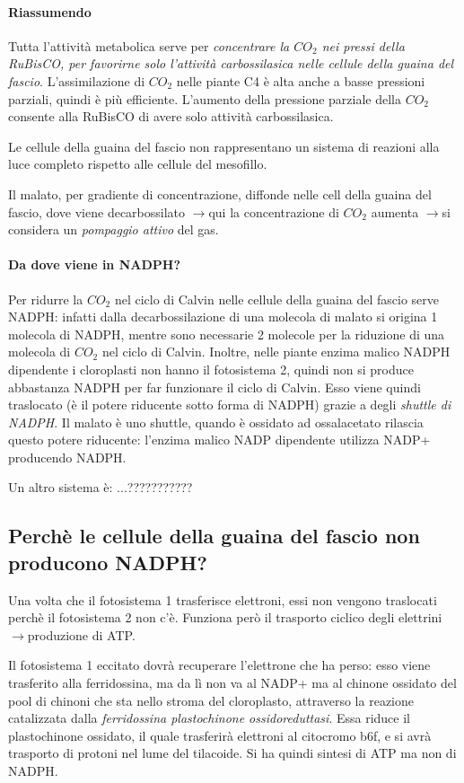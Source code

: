 \documentclass[a4paper,12pt]{book}
\newcommand{\lfreccia}{\ensuremath{\longrightarrow}}
\begin{document}
 \paragraph{Riassumendo}
Tutta l'attività metabolica serve per \emph{concentrare la $CO_{2}$ nei pressi della RuBisCO, per favorirne solo l'attività carbossilasica nelle cellule della guaina del fascio}.  L'assimilazione di $CO_{2}$ nelle piante C4 è alta anche a basse pressioni parziali, quindi è più efficiente. L'aumento della pressione parziale della $CO_{2}$ consente alla RuBisCO di avere solo attività carbossilasica.

Le cellule della guaina del fascio non rappresentano un sistema di reazioni alla luce completo rispetto alle cellule del mesofillo.

Il malato, per gradiente di concentrazione, diffonde nelle cell della guaina del fascio, dove viene decarbossilato \lfreccia qui la concentrazione di $CO_{2}$ aumenta \lfreccia si considera un \emph{pompaggio attivo} del gas.

\paragraph{Da dove viene in NADPH?}
Per ridurre la $CO_{2}$ nel ciclo di Calvin nelle cellule della guaina del fascio serve NADPH: infatti dalla decarbossilazione di una molecola di
malato si origina 1 molecola di NADPH, mentre sono necessarie 2
molecole per la riduzione di una molecola di $CO_{2}$ nel ciclo di Calvin. Inoltre, nelle piante enzima malico NADPH dipendente i cloroplasti non hanno il fotosistema 2, quindi non si produce abbastanza NADPH per far funzionare il ciclo di Calvin. Esso viene quindi traslocato (è il potere riducente sotto forma di NADPH) grazie a degli \emph{shuttle di NADPH}. Il malato è uno shuttle, quando è ossidato ad ossalacetato rilascia questo potere riducente: l'enzima malico NADP dipendente utilizza NADP+ producendo NADPH.

Un altro sistema è:  ...???????????

\subsection{Perchè le cellule della guaina del fascio non producono NADPH?}
Una volta che il fotosistema 1 trasferisce elettroni, essi non vengono traslocati perchè il fotosistema 2 non c'è. Funziona però il trasporto ciclico degli elettrini \lfreccia produzione di ATP.

Il fotosistema 1 eccitato dovrà recuperare l'elettrone che ha perso: esso viene trasferito alla ferridossina, ma da lì non va al NADP+ ma al chinone ossidato del pool di chinoni che sta nello stroma del cloroplasto, attraverso la reazione catalizzata dalla \emph{ferridossina plastochinone ossidoreduttasi}. Essa riduce il plastochinone ossidato, il quale trasferirà elettroni al citocromo b6f, e si avrà trasporto di protoni nel lume del tilacoide. Si ha quindi sintesi di ATP ma non di NADPH.
\end{document}

